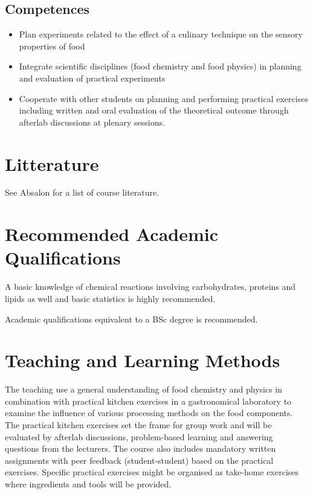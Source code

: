 \subsection{Competences}  
\begin{highlight}
    \begin{itemize}
        \item Plan experiments related to the effect of a culinary technique on the sensory properties of food
        \item Integrate scientific disciplines (food chemistry and food physics) in planning and evaluation of practical experiments
        \item Cooperate with other students on planning and performing practical exercises including written and oral evaluation of the theoretical outcome through afterlab discussions at plenary sessions.
    \end{itemize}
\end{highlight}

\section{Litterature}
See Absalon for a list of course literature.

\section{Recommended Academic Qualifications}
A basic knowledge of chemical reactions involving carbohydrates, proteins and lipids as well and basic statistics is highly recommended.

Academic qualifications equivalent to a BSc degree is recommended.

\section{Teaching and Learning Methods}
The teaching use a general understanding of food chemistry and physics in combination with practical kitchen exercises in a gastronomical laboratory to examine the influence of various processing methods on the food components. The practical kitchen exercises set the frame for group work and will be evaluated by afterlab discussions, problem-based learning and answering questions from the lecturers. The course also includes mandatory written assignments with peer feedback (student-student) based on the practical exercises. Specific practical exercises might be organised as take-home exercises where ingredients and tools will be provided.

